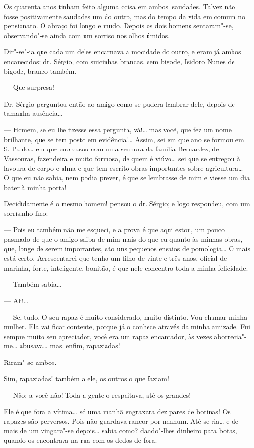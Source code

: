 Os quarenta anos tinham feito alguma coisa em ambos: saudades. Talvez
não fosse positivamente saudades um do outro, mas do tempo da vida em
comum no pensionato. O abraço foi longo e mudo. Depois os dois homens
sentaram"-se, observando"-se ainda com um sorriso nos olhos úmidos.

Dir"-se"-ia que cada um deles encarnava a mocidade do outro, e eram já
ambos encanecidos; dr. Sérgio, com suicinhas brancas, sem bigode,
Isidoro Nunes de bigode, branco também.

--- Que surpresa!

Dr. Sérgio perguntou então ao amigo como se pudera lembrar dele, depois
de tamanha ausência\ldots{}

--- Homem, se eu lhe fizesse essa pergunta, vá!\ldots{} mas você, que fez um
nome brilhante, que se tem posto em evidência!\ldots{} Assim, sei em que ano
se formou em S. Paulo\ldots{} em que ano casou com uma senhora da família
Bernardes, de Vassouras, fazendeira e muito formosa, de quem é viúvo\ldots{}
sei que se entregou à lavoura de corpo e alma e que tem escrito obras
importantes sobre agricultura\ldots{} O que eu não sabia, nem podia prever, é
que se lembrasse de mim e viesse um dia bater à minha porta!

Decididamente é o mesmo homem! pensou o dr. Sérgio; e logo respondeu,
com um sorrisinho fino:

--- Pois eu também não me esqueci, e a prova é que aqui estou, um pouco
pasmado de que o amigo saiba de mim mais do que eu quanto às minhas
obras, que, longe de serem importantes, são uns pequenos ensaios de
pomologia\ldots{} O mais está certo. Acrescentarei que tenho um filho de
vinte e três anos, oficial de marinha, forte, inteligente, bonitão, é
que nele concentro toda a minha felicidade.

--- Também sabia\ldots{}

--- Ah!\ldots{}

--- Sei tudo. O seu rapaz é muito considerado, muito distinto. Vou
chamar minha mulher. Ela vai ficar contente, porque já o conhece através
da minha amizade. Fui sempre muito seu apreciador, você era um rapaz
encantador, às vezes aborrecia"-me\ldots{} abusava\ldots{} mas, enfim, rapaziadas!

Riram"-se ambos.

Sim, rapaziadas! também a ele, os outros o que faziam!

--- Não: a você não! Toda a gente o respeitava, até os grandes!

Ele é que fora a vítima\ldots{} só uma manhã engraxara dez pares de botinas!
Os rapazes são perversos. Pois não guardava rancor por nenhum. Até se
ria\ldots{} e de mais de um vingara"-se depois\ldots{} sabia como? dando"-lhes
dinheiro para botas, quando os encontrava na rua com os dedos de fora.

